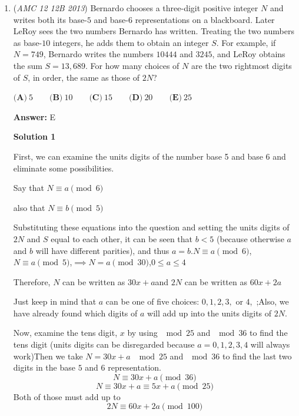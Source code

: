 \begin{enumerate}
 
 

 
	It remains to minimize the integer value of $\sqrt[8]{m^7n^6}$. Since $m, n>1$, we can check that $m = 2^2$ and $n = 2^3$ work. Thus the answer is $4+8 = \boxed{\textbf{(A)}\ 12}$.

 
 

 
 

 


	\item (\textit{AMC 12 12B 2013}) Bernardo chooses a three-digit positive integer $N$ and writes both its base-$5$ and base-$6$ representations on a blackboard. Later LeRoy sees the two numbers Bernardo has written. Treating the two numbers as base-$10$ integers, he adds them to obtain an integer $S$. For example, if $N=749$, Bernardo writes the numbers $10444$ and $3245$, and LeRoy obtains the sum $S=13,689$. For how many choices of $N$ are the two rightmost digits of $S$, in order, the same as those of $2N$?


 $\textbf{(A)}\ 5\qquad\textbf{(B)}\ 10\qquad\textbf{(C)}\ 15\qquad\textbf{(D)}\ 20\qquad\textbf{(E)}\ 25$

 \textbf{Answer: }E



\textbf{Solution 1}

First, we can examine the units digits of the number base 5 and base 6 and eliminate some possibilities.

 Say that $N \equiv a \pmod{6}$

 also that $N \equiv b \pmod{5}$

 Substituting these equations into the question and setting the units digits of $2N$ and $S$ equal to each other, it can be seen that $b < 5$ (because otherwise $a$ and $b$ will have different parities), and thus $a=b$.$N \equiv a \pmod{6}$,$N \equiv  a \pmod{5}$,$\implies N=a \pmod{30}$,$0 \le a \le 4$

 Therefore, $N$ can be written as  $30x+a$and $2N$ can be written as $60x+2a$ 

 Just keep in mind that $a$ can be one of five choices: $0, 1, 2, 3,$ or $4$, ;Also, we have already found which digits of $a$ will add up into the units digits of $2N$.

 Now, examine the tens digit, $x$ by using $\mod{25}$ and $\mod{36}$ to find the tens digit (units digits can be disregarded because $a=0,1,2,3,4$ will always work)Then we take $N=30x+a$ $\mod{25}$ and $\mod{36}$ to find the last two digits in the base $5$ and $6$ representation.
 \[N \equiv 30x + a \pmod{36}\]
 \[N \equiv 30x + a \equiv 5x + a \pmod{25}\] Both of those must add up to 
 \[2N\equiv60x + 2a \pmod{100}\]


\end{enumerate}

